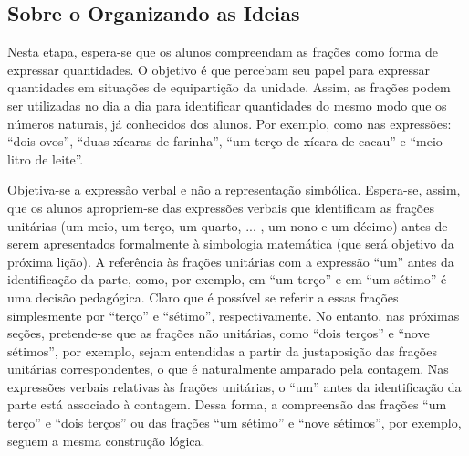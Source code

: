 \subsection{Sobre o Organizando as Ideias}

  Nesta etapa, espera-se que os alunos compreendam as frações como forma de expressar quantidades. O objetivo é que percebam seu papel para expressar quantidades em situações de equipartição da unidade. Assim, as frações podem ser utilizadas no dia a dia para identificar quantidades do mesmo modo que os números naturais, já conhecidos dos alunos. Por exemplo, como nas expressões:   ``dois ovos'',   ``duas xícaras de farinha'',   ``um terço de xícara de cacau'' e   ``meio litro de leite''.

  Objetiva-se a expressão verbal e não a representação simbólica. Espera-se, assim, que os alunos apropriem-se das expressões verbais que identificam as frações unitárias (um meio, um terço, um quarto, ... , um nono e um décimo) antes de serem apresentados formalmente à simbologia matemática (que será objetivo da próxima lição).  A referência às frações unitárias com a expressão   ``um'' antes da identificação da parte, como, por exemplo, em   ``um terço'' e em   ``um sétimo'' é uma decisão pedagógica. Claro que é possível se referir a essas frações simplesmente por   ``terço'' e   ``sétimo'', respectivamente. No entanto, nas próximas seções, pretende-se que as frações não unitárias, como   ``dois terços'' e   ``nove sétimos'', por exemplo, sejam entendidas a partir da justaposição das frações unitárias correspondentes, o que é naturalmente amparado pela contagem. Nas expressões verbais relativas às frações unitárias, o   ``um'' antes da identificação da parte está associado à contagem. Dessa forma, a compreensão das frações   ``um terço'' e   ``dois terços'' ou das frações ``um sétimo'' e ``nove sétimos'', por exemplo, seguem a mesma construção lógica.

\Bg

